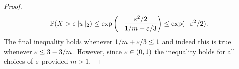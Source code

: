 \begin{proof}
  \begin{equation} \label{eq: countsketch_bernstein}
    \mathbb{P} (X > \varepsilon \| u \|_2) \le \exp \left( - \frac{\varepsilon^2 /
    2}{1/m + \varepsilon /3 } \right)
    \le \exp(-\varepsilon^2/2).
  \end{equation}
  The final inequality holds whenever $1/m + \varepsilon / 3 \le 1$ and indeed this is
  true whenever $\varepsilon \le 3 - 3/m$.
  However, since $\varepsilon \in (0,1)$ the inequality holds
  for all choices of $\varepsilon$ provided $m>1$.

\end{proof}

